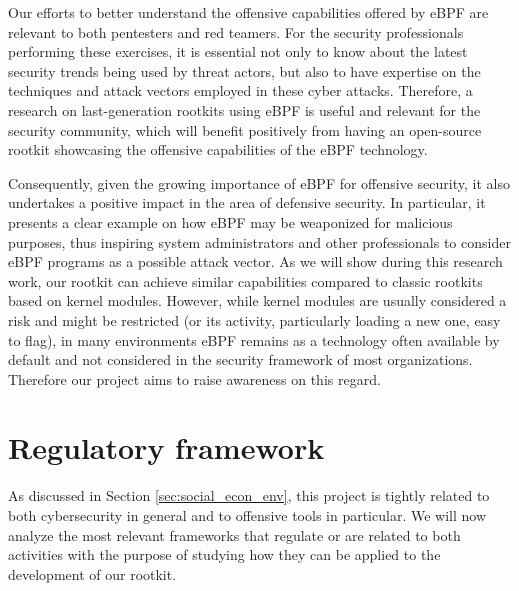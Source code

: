 Our efforts to better understand the offensive capabilities offered by eBPF
are relevant to both pentesters and red teamers. For the security
professionals performing these exercises, it is essential not only to know
about the latest security trends being used by threat actors, but also to
have expertise on the techniques and attack vectors employed in these cyber
attacks. Therefore, a research on last-generation rootkits using eBPF is
useful and relevant for the security community, which will benefit
positively from having an open-source rootkit showcasing the offensive
capabilities of the eBPF technology.

Consequently, given the growing importance of eBPF for offensive security,
it also undertakes a positive impact in the area of defensive security. In
particular, it presents a clear example on how eBPF may be weaponized for
malicious purposes, thus inspiring system administrators and other
professionals to consider eBPF programs as a possible attack vector. As we
will show during this research work, our rootkit can achieve similar
capabilities compared to classic rootkits based on kernel modules. However,
while kernel modules are usually considered a risk and might be restricted
(or its activity, particularly loading a new one, easy to flag), in many
environments eBPF remains as a technology often available by default and
not considered in the security framework of most organizations. Therefore
our project aims to raise awareness on this regard.


\section{Regulatory framework}
As discussed in Section \ref{sec:social_econ_env}, this project is tightly
related to both cybersecurity in general and to offensive tools in
particular. We will now analyze the most relevant frameworks that regulate
or are related to both activities with the purpose of studying how they can
be applied to the development of our rootkit.

